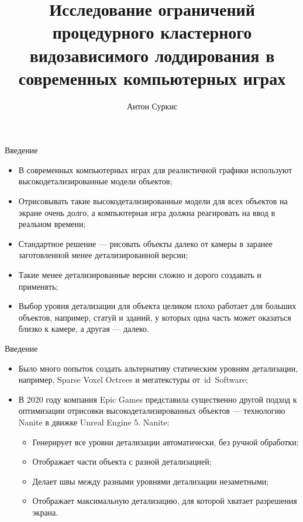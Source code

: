 \documentclass{beamer}
\title[Ограничения Nanite]{Исследование ограничений процедурного кластерного видозависимого лоддирования в современных компьютерных играх}
\author{Антон Суркис}
\begin{document}
    \maketitle

    \begin{frame}{Введение}
        \begin{itemize}
            \item В современных компьютерных играх для реалистичной графики используют высокодетализированные модели объектов;
            \item Отрисовывать такие высокодетализированные модели для всех объектов на экране очень долго, а компьютерная игра должна реагировать на ввод в реальном времени;
            \item Стандартное решение --- рисовать объекты далеко от камеры в заранее заготовленной менее детализированной версии;
            \item Такие менее детализированные версии сложно и дорого создавать и применять;
            \item Выбор уровня детализации для объекта целиком плохо работает для больших объектов, например, статуй и зданий, у которых одна часть может оказаться близко к камере, а другая --- далеко.
        \end{itemize}
    \end{frame}

    \begin{frame}{Введение}
        \begin{itemize}
            \item Было много попыток создать альтернативу статическим уровням детализации, например, Sparse Voxel Octrees и мегатекстуры от~id~Software;
            \item В 2020 году компания Epic Games представила существенно другой подход к оптимизации отрисовки высокодетализированных объектов --- технологию Nanite в движке Unreal Engine 5. Nanite:
            \begin{itemize}
                \item Генерирует все уровни детализации автоматически, без ручной обработки;
                \item Отображает части объекта с разной детализацией;
                \item Делает швы между разными уровнями детализации незаметными;
                \item Отображает максимальную детализацию, для которой хватает разрешения экрана.
            \end{itemize}
        \end{itemize}
    \end{frame}
\end{document}
